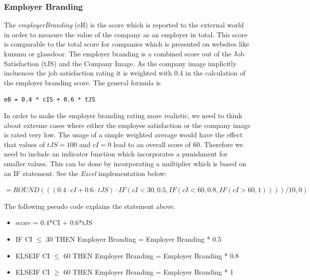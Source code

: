 \subsubsection{Employer Branding}\label{employer_branding}


The \textit{employerBranding} (\gls{eB}) is the score which is reported to the external world in order to measure the value of the company as an employer in total. This score is comparable to the total score for companies which is presented on websites like kununu or glassdoor. The employer branding is a combined score out of the Job Satisfaction (\gls{tJS}) and the Company Image. As the company image implicitly incluences the job satisfaction rating it is weighted with 0.4 in the calculation of the employer branding score. The general formula is
\begin{center}
\texttt{eB = 0.4 * cIS + 0.6 * tJS} \\
\end{center}

In order to make the employer branding rating more realistic, we need to think about extreme cases where either the employee satisfaction or the company image is rated very low. The usage of a simple weighted average would have the effect that values of $tJS = 100$ and $cI = 0$ lead to an overall score of 60.
Therefore we need to include an indicator function which incorporates a punishment for smaller values.
This can be done by incorporating a multiplier which is based on an IF statement. See the \textit{Excel} implementation below:
\begin{center}
    $=ROUND(((0.4 \cdot cI+0.6 \cdot tJS) \cdot IF(cI<30,0.5,IF(cI<60,0.8,IF(cI>60,1))))/10,0)$
\end{center}

The following pseudo code explains the statement above.

\begin{itemize}
    \item score = 0.4*CI + 0.6*tJS
    \item IF CI $\leq$ 30 THEN Employer Branding = Employer Branding * 0.5
    \item ELSEIF CI $\leq$ 60 THEN Employer Branding = Employer Branding * 0.8
    \item ELSEIF CI $\geq$ 60 THEN Employer Branding = Employer Branding * 1
\end{itemize}


